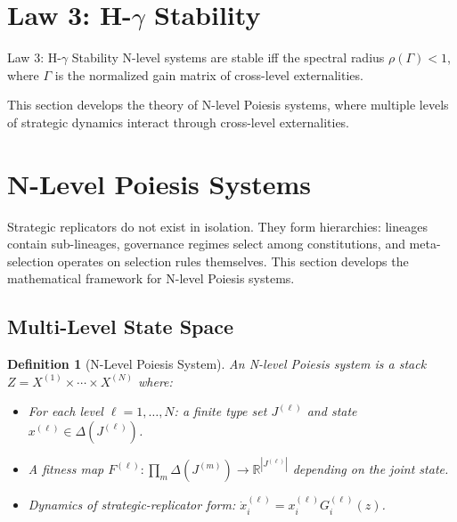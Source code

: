 \documentclass[12pt]{article}
\newtheorem{definition}[theorem]{Definition}
\newcommand{\R}{\mathbb{R}}
\begin{document}

\section{Law 3: H-$\gamma$ Stability}
\label{sec:law3}

\begin{lawbox}{Law 3: H-$\gamma$ Stability}
N-level systems are stable iff the spectral radius $\rho(\Gamma) < 1$, where $\Gamma$ is the normalized gain matrix of cross-level externalities.
\end{lawbox}

This section develops the theory of N-level Poiesis systems, where multiple levels of strategic dynamics interact through cross-level externalities.

\section{N-Level Poiesis Systems}
\label{sec:n-level}

Strategic replicators do not exist in isolation. They form hierarchies: lineages contain sub-lineages, governance regimes select among constitutions, and meta-selection operates on selection rules themselves. This section develops the mathematical framework for N-level Poiesis systems.

\subsection{Multi-Level State Space}

\begin{definition}[N-Level Poiesis System]
An \emph{N-level Poiesis system} is a stack $Z = X^{(1)} \times \cdots \times X^{(N)}$ where:
\begin{itemize}
    \item For each level $\ell = 1, \ldots, N$: a finite type set $J^{(\ell)}$ and state $x^{(\ell)} \in \Delta(J^{(\ell)})$.
    \item A fitness map $F^{(\ell)}: \prod_m \Delta(J^{(m)}) \to \R^{|J^{(\ell)}|}$ depending on the joint state.
    \item Dynamics of strategic-replicator form: $\dot{x}^{(\ell)}_i = x^{(\ell)}_i G^{(\ell)}_i(z)$.
\end{itemize}
\end{definition}
\end{document}
